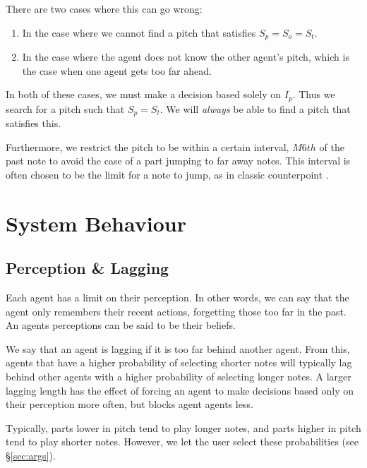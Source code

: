 \documentclass[12pt]{article}
\begin{document}
	There are two cases where this can go wrong:
	\begin{enumerate}
		\item In the case where we cannot find a pitch that satisfies $S_p = S_o = S_t$.
		\item In the case where the agent does not know the other agent's pitch, which is the case when one agent gets too far ahead.
	\end{enumerate}
	In both of these cases, we must make a decision based solely on $I_p$. Thus we search for a pitch such that $S_p = S_t$. We will {\it always} be able to find a pitch that satisfies this.
	
	Furthermore, we restrict the pitch to be within a certain interval, $M6th$ of the past note to avoid the case of a part jumping to far away notes. This interval is often chosen to be the limit for a note to jump, as in classic counterpoint \cite{mann1965study}.
	
	
	\section{System Behaviour}
	\subsection{Perception \& Lagging}
	Each agent has a limit on their perception. In other words, we can say that the agent only remembers their recent actions, forgetting those too far in the past. An agents perceptions can be said to be their beliefs.
	
	We say that an agent is lagging if it is too far behind another agent. From this, agents that have a higher probability of selecting shorter notes will typically lag behind other agents with a higher probability of selecting longer notes. A larger lagging length has the effect of forcing an agent to make decisions based only on their perception more often, but blocks agent agents less.
	
	Typically, parts lower in pitch tend to play longer notes, and parts higher in pitch tend to play shorter notes. However, we let the user select these probabilities (see \S \ref{sec:args}). 
	
\end{document}
